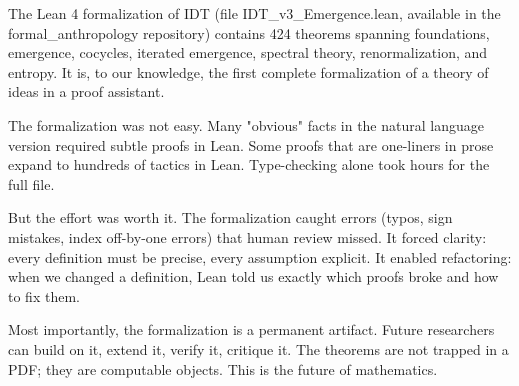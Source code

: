 \begin{remark}
The Lean 4 formalization of IDT (file IDT\_v3\_Emergence.lean, available in the
formal\_anthropology repository) contains 424 theorems spanning foundations,
emergence, cocycles, iterated emergence, spectral theory, renormalization, and
entropy. It is, to our knowledge, the first complete formalization of a theory
of ideas in a proof assistant.

The formalization was not easy. Many "obvious" facts in the natural language
version required subtle proofs in Lean. Some proofs that are one-liners in prose
expand to hundreds of tactics in Lean. Type-checking alone took hours for the
full file.

But the effort was worth it. The formalization caught errors (typos, sign mistakes,
index off-by-one errors) that human review missed. It forced clarity: every
definition must be precise, every assumption explicit. It enabled refactoring:
when we changed a definition, Lean told us exactly which proofs broke and how to
fix them.

Most importantly, the formalization is a permanent artifact. Future researchers
can build on it, extend it, verify it, critique it. The theorems are not trapped
in a PDF; they are computable objects. This is the future of mathematics.
\end{remark}
